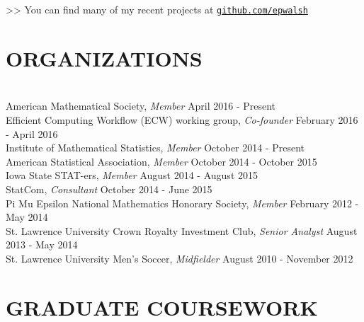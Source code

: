 \documentclass{res} %
\begin{document}
\begin{resume}
>> You can find many of my recent projects at \href{http://github.com/epwalsh}{\texttt{github.com/epwalsh}}


\section{ORGANIZATIONS}

\hrulefill \\
American Mathematical Society, {\sl Member} \dotfill April 2016 - Present \\
Efficient Computing Workflow (ECW) working group, {\sl Co-founder} \dotfill February 2016 - April 2016 \\
Institute of Mathematical Statistics, {\sl Member} \dotfill October 2014 - Present \\
American Statistical Association, {\sl Member} \dotfill October 2014 - October 2015 \\
Iowa State STAT-ers, {\sl Member} \dotfill August 2014 - August 2015 \\
StatCom, {\sl Consultant} \dotfill October 2014 - June 2015\\
Pi Mu Epsilon National Mathematics Honorary Society, {\sl Member} \dotfill February 2012 - May 2014 \\
St. Lawrence University Crown Royalty Investment Club, {\sl Senior Analyst} \dotfill August 2013 - May 2014 \\
St. Lawrence University Men's Soccer, {\sl Midfielder} \dotfill August 2010 - November 2012 


\section{GRADUATE COURSEWORK}


\end{resume}
\end{document}
